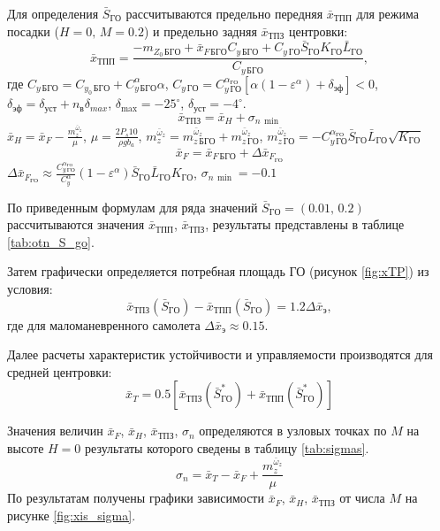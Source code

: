 Для определения $\bar{S}_{ГО}$ рассчитываются
предельно передняя $\bar{x}_{ТПП}$ для режима
посадки ($H=0,\, M=0.2$) и предельно задняя
$\bar{x}_{ТПЗ}$ центровки:
\begin{equation}
    \bar{x}_{ТПП} = \frac{-m_{Z_0\, БГО} + \bar{x}_{F\, БГО}C_{y\, БГО}+ 
    C_{y\, ГО} \bar{S}_{ГО} K_{ГО} \bar{L}_{ГО}}{C_{y\, БГО}},
\end{equation}
где $C_{y \, БГО} = C_{y_0\,{БГО}} + C_{y\, БГО}^\alpha \alpha$, 
$C_{y\, ГО} = C_{y\, ГО}^{\alpha_{ГО}} \left[ \alpha(1-\varepsilon^\alpha) + 
\delta_{эф}\right] < 0$, $\delta_{эф} = \delta_{уст} + n_в \delta_{max}$,
$\delta_{\max} = -25^\circ$, $\delta_{уст} = -4^\circ$. 
\begin{equation}
    \bar{x}_{ТПЗ} = \bar{x}_{H} + \sigma_{n\, \min}
\end{equation}
$\bar{x}_{H} = \bar{x}_F - \frac{m_z^{\bar{\omega}_z}}{\mu}$, $\mu = \frac{2 P_s 10 }{\rho g b_a}$,
$m_z^{\bar{\omega}_z} = m_{z\, БГО}^{\bar{\omega}_z}+m_{z\, ГО}^{\bar{\omega}_z}$,
$m_{z\, ГО}^{\bar{\omega}_z} = - C_{y\, {ГО}}^{\alpha_{ГО}} \bar{S}_{ГО} \bar{L}_{ГО}
\sqrt{K_{ГО}}$
\begin{equation}
    \bar{x}_F = \bar{x}_{F\, БГО} + \Delta \bar{x}_{F_{ГО}}
\end{equation}
$ \Delta \bar{x}_{F_{ГО}} \approx \frac{C_{y\, ГО}^{\alpha_{ГО}} }{C_{y}^\alpha}
(1-\varepsilon^\alpha)\bar{S}_{ГО} \bar{L}_{ГО}
K_{ГО}$, $\sigma_{n\, \min} = -0.1$

По приведенным формулам для ряда значений
$\bar{S}_{ГО} = (0.01,\, 0.2)$ рассчитываются значения $\bar{x}_{ТПП}$,
$\bar{x}_{ТПЗ}$, результаты представлены в таблице \ref{tab:otn_S_go}. 

Затем графически  определяется потребная площадь ГО (рисунок \ref{fig:xTP}) из условия:
\[
    \bar{x}_{ТПЗ}(\bar{S}_{ГО}) - \bar{x}_{ТПП}(\bar{S}_{ГО}) = 1.2 \Delta \bar{x}_{э},
\]
где для маломаневренного самолета $\Delta \bar{x}_{э} \approx 0.15$.

Далее расчеты характеристик устойчивости и управляемости производятся
для средней центровки: 
\[
    \bar{x}_{T} = 0.5 \left[  \bar{x}_{ТПЗ}(\bar{S}_{ГО}^*) + \bar{x}_{ТПП}(\bar{S}_{ГО}^*) \right] 
\]

Значения величин $\bar{x}_F$, $\bar{x}_H$, $\bar{x}_{ТПЗ}$, $\sigma_n$ определяются в
узловых точках по $M$ на высоте $H=0$ результаты которого сведены в таблицу
\ref{tab:sigmas}. 
\[
    \sigma_n = \bar{x}_{T} - \bar{x}_{F} + \frac{m_z^{\bar{\omega}_z}}{\mu}
\]
По результатам получены графики зависимости $\bar{x}_F$, $\bar{x}_H$,
$\bar{x}_{ТПЗ}$ от числа $M$ на рисунке \ref{fig:xis_sigma}.

